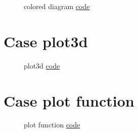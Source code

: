 \documentclass{article}
\begin{document}
\begin{figure}[H]
    \centering
    
    \caption{colored diagram \href{https:/github.com/cauliyang/learn_tikz/blob/main/source/colored_diagram.tex}{code} }
    \label{fig:colored diagram}
\end{figure}
    
\section{Case plot3d}

\begin{figure}[H]
    \centering
    
    \caption{plot3d \href{https:/github.com/cauliyang/learn_tikz/blob/main/source/plot3d.tex}{code} }
    \label{fig:plot3d}
\end{figure}
    
\section{Case plot function}

\begin{figure}[H]
    \centering
    
    \caption{plot function \href{https:/github.com/cauliyang/learn_tikz/blob/main/source/plot_function.tex}{code} }
    \label{fig:plot function}
\end{figure}
\end{document}
